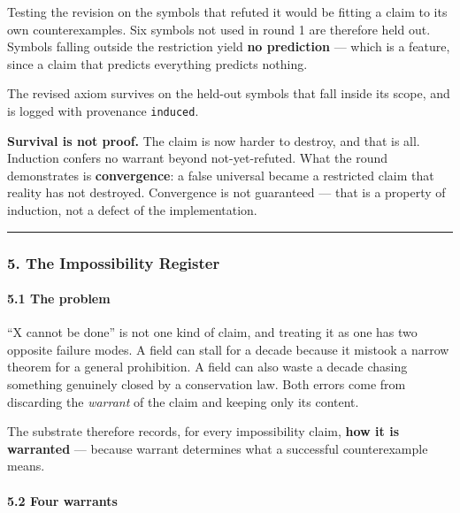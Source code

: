 \documentclass[
  11pt,
  a4paper,
]{article}
\begin{document}
Testing the revision on the symbols that refuted it would be fitting a
claim to its own counterexamples. Six symbols not used in round 1 are
therefore held out. Symbols falling outside the restriction yield
\textbf{no prediction} --- which is a feature, since a claim that
predicts everything predicts nothing.

The revised axiom survives on the held-out symbols that fall inside its
scope, and is logged with provenance \texttt{induced}.

\textbf{Survival is not proof.} The claim is now harder to destroy, and
that is all. Induction confers no warrant beyond not-yet-refuted. What
the round demonstrates is \textbf{convergence}: a false universal became
a restricted claim that reality has not destroyed. Convergence is not
guaranteed --- that is a property of induction, not a defect of the
implementation.

\begin{center}\rule{0.5\linewidth}{0.5pt}\end{center}

\subsubsection{5. The Impossibility
Register}\label{the-impossibility-register}

\paragraph{5.1 The problem}\label{the-problem}

``X cannot be done'' is not one kind of claim, and treating it as one
has two opposite failure modes. A field can stall for a decade because
it mistook a narrow theorem for a general prohibition. A field can also
waste a decade chasing something genuinely closed by a conservation law.
Both errors come from discarding the \emph{warrant} of the claim and
keeping only its content.

The substrate therefore records, for every impossibility claim,
\textbf{how it is warranted} --- because warrant determines what a
successful counterexample means.

\paragraph{5.2 Four warrants}\label{four-warrants}
\end{document}
